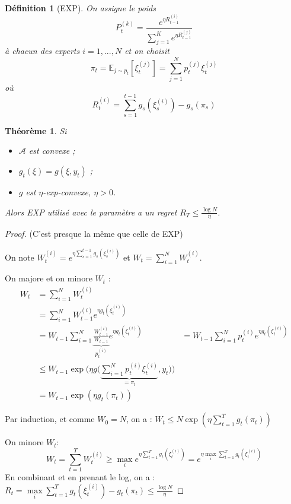 \documentclass{article}
\newtheorem{definition}{Définition}[section]
\newtheorem{theorem}{Théorème}[section]
\theoremstyle{remark}
\theoremstyle{remark}
\begin{document}
\begin{definition}[EXP]
   On assigne le poids
   $$
   P_t^{(k)} = \frac{e^{\eta R_{t-1}^{(i)}}}{\sum\limits_{j=1}^Ke^{\eta R_{t-1}^{(j)}}}
   $$
   à chacun des experts $i = 1,...,N$ et on choisit
   $$
   \pi_t = \mathbb{E}_{j \sim p_t}[\xi_t^{(j)}] = \sum_{j=1}^N p_t^{(j)} \xi_t^{(j)}
   $$
   où
   $$
   R_t^{(i)} = \sum_{s=1}^{t-1} g_s(\xi_s^{(i)}) - g_s(\pi_s)
   $$
\end{definition}

\begin{theorem}
   Si
   \begin{itemize}
      \item $\mathcal{A}$ est convexe ;
      \item $g_t(\xi) = g(\xi, y_t)$ ;
      \item $g$ est $\eta$-exp-convexe, $\eta > 0$.
   \end{itemize}

   Alors EXP utilisé avec le paramètre a un regret $R_T \leq \frac{\log N}{\eta}$.
\end{theorem}

\begin{proof}
   (C'est presque la même que celle de EXP)

   On note $W_t^{(i)} = e^{\eta \sum\limits_{s=1}^{t-1} g_s(\xi_s^{(i)})}$ et $W_t = \sum_{i=1}^N W_t^{(i)}$.

   On majore et on minore $W_t$ :
   \begin{align*}
      W_t &= \sum_{i=1}^N W_t^{(i)} \\
      &= \sum_{i=1}^N W_{t-1}^{(i)} e^{\eta g_t(\xi_t^{(i)})} \\
      &= W_{t-1} \sum_{i =1}^N \underbrace{\frac{W_{t-1}^{(i)}}{W_{t-1}}}_{p_t^{(i)}} e^{\eta g_t(\xi_t^{(i)})}
      &= W_{t-1} \sum_{i =1}^N p_t^{(i)} e^{\eta g_t(\xi_t^{(i)})} \\
      &\leq W_{t-1} \exp\Bigg( \eta g\Big(\underbrace{\sum_{i=1}^N p_t^{(i)} \xi_t^{(i)}}_{= \pi_t}, y_t\Big) \Bigg) \\
      &= W_{t-1} \exp(\eta g_t(\pi_t))
   \end{align*}

   Par induction, et comme $W_0 = N$, on a : $W_t \leq N \exp\left(\eta \sum\limits_{t=1}^T g_t(\pi_t) \right)$

   On minore $W_t$:
   $$
   W_t = \sum_{t=1}^T W_t^{(i)} \geq \max_i e^{\eta \sum\limits_{t=1}^T g_t(\xi_t^{(i)})} = e^{\eta \max\limits_i \sum\limits_{t=1}^T g_t(\xi_t^{(i)})}
   $$
   En combinant et en prenant le log, on a : $R_t = \max\limits_i \sum\limits_{t=1}^T g_t(\xi_t^{(i)})  - g_t(\pi_t) \leq \frac{\log N}{\eta}$
\end{proof}
\end{document}
